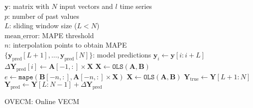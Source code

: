 \begin{algorithm}[ht]
\begin{algorithmic}[1]
\REQUIRE $\,$ \\
$\mathbf{y}$: matrix with $N$ input vectors and $l$ time series\\
$p$: number of past values \\
$L$: sliding window size ($L<N$) \\
$\text{mean\_error}$: MAPE threshold \\
$n$: interpolation points to obtain MAPE \\
\ENSURE  $\,$ \\
$\{\mathbf{y}_{\text{pred}}[L+1],\dots,\mathbf{y}_{\text{pred}}[N]\}$: model predictions 
    \STATE $\mathbf{y}_i \gets \mathbf{y}[i:i+L]$
	\ELSE
        \STATE $\Delta \mathbf{Y}_{\text{pred}}[i] \gets \mathbf{A}[-1,:] \times \mathbf{X}$
    \ENDIF
    \STATE $\mathbf{X} \gets \texttt{OLS} (\mathbf{A},\mathbf{B})$%
    \STATE $e \gets \texttt{mape}(\mathbf{B}[-n,:],\mathbf{A}[-n,:] \times \mathbf{X})$
        \STATE $\mathbf{X} \gets \texttt{OLS} (\mathbf{A},\mathbf{B})$%
    \ENDIF
\ENDFOR
\STATE $\mathbf{Y}_{\text{true}} \gets \mathbf{Y}[L+1:N]$
\STATE $\mathbf{Y}_{\text{pred}}\gets 
\mathbf{Y}[L:N-1] +\Delta \mathbf{Y}_{\text{pred}}$
\end{algorithmic}
\caption{OVECM: Online VECM}
\label{alg:proposal}
\end{algorithm}



